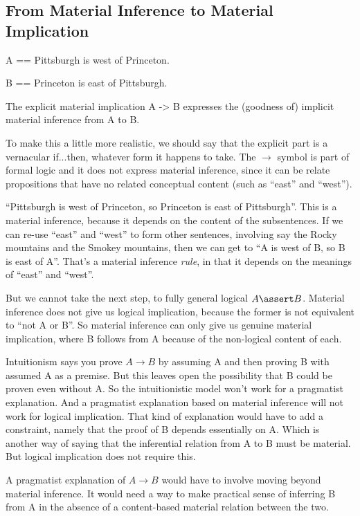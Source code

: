 \documentclass{article}
\begin{document}
\subsection{From Material Inference to Material Implication}

A == Pittsburgh is west of Princeton.

B == Princeton is east of Pittsburgh.

The explicit material implication A -> B expresses the (goodness of) implicit
material inference from A to B.

To make this a little more realistic, we should say that the explicit
part is a vernacular if...then, whatever form it happens to take. The
\(\rightarrow\) symbol is part of formal logic and it does not express
material inference, since it can be relate propositions that have no
related conceptual content (such as ``east'' and ``west'').

``Pittsburgh is west of Princeton, so Princeton is east of
Pittsburgh''. This is a material inference, because it depends on the
content of the subsentences. If we can re-use ``east'' and ``west'' to
form other sentences, involving say the Rocky mountains and the
Smokey mountains, then we can get to ``A is west of B, so B is east of
A''. That's a material inference \textit{rule}, in that it depends on the
meanings of ``east'' and ``west''.

But we cannot take the next step, to fully general logical \(A\linfer
B\). Material inference does not give us logical implication, because
the former is not equivalent to ``not A or B''. So material inference
can only give us genuine material implication, where B follows from A
because of the non-logical content of each.

Intuitionism says you prove \(A\rightarrow B\) by assuming A and then
proving B with assumed A as a premise. But this leaves open the
possibility that B could be proven even without A. So the
intuitionistic model won't work for a pragmatist explanation. And a
pragmatist explanation based on material inference will not work for
logical implication. That kind of explanation would have to add a
constraint, namely that the proof of B depends essentially on A. Which
is another way of saying that the inferential relation from A to B
must be material. But logical implication does not require this.


A pragmatist explanation of \(A\rightarrow B\) would have to involve
moving beyond material inference. It would need a way to make
practical sense of inferring B from A in the absence of a content-based
material relation between the two.
\end{document}
